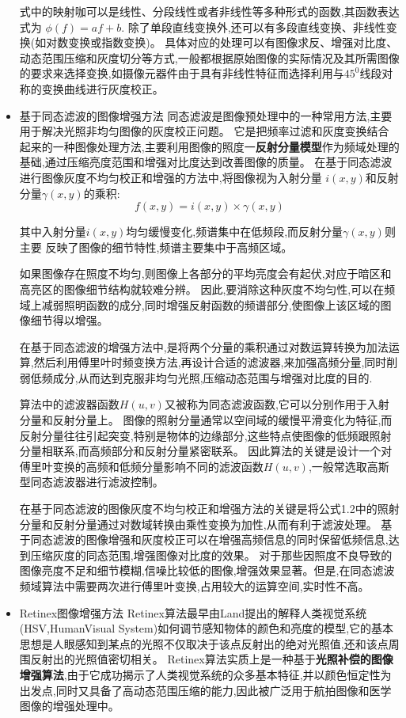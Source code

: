 \documentclass{amsart}
\begin{document}
\begin{itemize}
式中的映射咖可以是线性、分段线性或者非线性等多种形式的函数,其函数表达式为
$\phi(f)=af+b$.
除了单段直线变换外,还可以有多段直线变换、非线性变换(如对数变换或指数变换)。
具体对应的处理可以有图像求反、增强对比度、动态范围压缩和灰度切分等方式,一般都根据原始图像的实际情况及其所需图像的要求来选择变换,如摄像元器件由于具有非线性特征而选择利用与$45^0$线段对称的变换曲线进行灰度校正。
\item 基于同态滤波的图像增强方法
  同态滤波是图像预处理中的一种常用方法,主要用于解决光照非均匀图像的灰度校正问题。
  它是把频率过滤和灰度变换结合起来的一种图像处理方法,主要利用图像的照度一\textbf{反射分量模型}作为频域处理的基础,通过压缩亮度范围和增强对比度达到改善图像的质量。
  在基于同态滤波进行图像灰度不均匀校正和增强的方法中,将图像视为入射分量
  $i(x,y)$和反射分量$\gamma(x,y)$的乘积:
  \begin{equation}
    \label{eq:21}
    f(x,y)=i(x,y)\times\gamma(x,y)
  \end{equation}


其中入射分量$i(x,y)$均匀缓慢变化,频谱集中在低频段,而反射分量$\gamma(x,y)$则主要
反映了图像的细节特性,频谱主要集中于高频区域。

如果图像存在照度不均匀,则图像上各部分的平均亮度会有起伏,对应于暗区和高亮区的图像细节结构就较难分辨。
因此,要消除这种灰度不均匀性,可以在频域上减弱照明函数的成分,同时增强反射函数的频谱部分,使图像上该区域的图像细节得以增强。

在基于同态滤波的增强方法中,是将两个分量的乘积通过对数运算转换为加法运算,然后利用傅里叶时频变换方法,再设计合适的滤波器,来加强高频分量,同时削弱低频成分,从而达到克服非均匀光照,压缩动态范围与增强对比度的目的.

算法中的滤波器函数$H(u,v)$又被称为同态滤波函数,它可以分别作用于入射分量和反射分量上。
图像的照射分量通常以空间域的缓慢平滑变化为特征,而反射分量往往引起突变,特别是物体的边缘部分,这些特点使图像的低频跟照射分量相联系,而高频部分和反射分量紧密联系。
因此算法的关键是设计一个对傅里叶变换的高频和低频分量影响不同的滤波函数$H(u,v)$,一般常选取高斯型同态滤波器进行滤波控制。


在基于同态滤波的图像灰度不均匀校正和增强方法的关键是将公式1.2中的照射分量和反射分量通过对数域转换由乘性变换为加性,从而有利于滤波处理。
基于同态滤波的图像增强和灰度校正可以在增强高频信息的同时保留低频信息,达到压缩灰度的同态范围,增强图像对比度的效果。
对于那些因照度不良导致的图像亮度不足和细节模糊,信噪比较低的图像,增强效果显著。但是,在同态滤波频域算法中需要两次进行傅里叶变换,占用较大的运算空间,实时性不高。
\item Retinex图像增强方法
  Retinex算法最早由Land提出的解释人类视觉系统(HSV,HumanVisual System)如何调节感知物体的颜色和亮度的模型,它的基本思想是人眼感知到某点的光照不仅取决于该点反射出的绝对光照值,还和该点周围反射出的光照值密切相关。
  Retinex算法实质上是一种基于\textbf{光照补偿的图像增强算法},由于它成功揭示了人类视觉系统的众多基本特征,并以颜色恒定性为出发点,同时又具备了高动态范围压缩的能力,因此被广泛用于航拍图像和医学图像的增强处理中。



\end{itemize}
\end{document}
